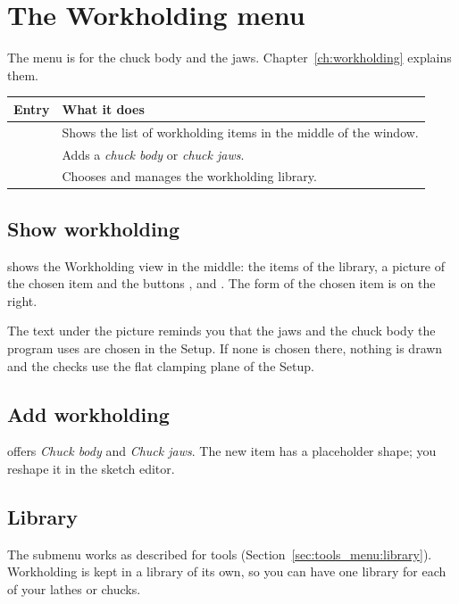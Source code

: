 \chapter{The Workholding menu}\label{ch:workholding_menu}

The  menu is for the chuck body and the jaws. Chapter~\ref{ch:workholding} explains them.

\begin{center}
\begin{tabularx}{\textwidth}{@{}l Y@{}}
\toprule
\textbf{Entry} & \textbf{What it does} \\
\midrule
{} & Shows the list of workholding items in the middle of the window. \\
 & Adds a \emph{chuck body} or \emph{chuck jaws}. \\
 & Chooses and manages the workholding library. \\
\bottomrule
\end{tabularx}
\end{center}

\section{Show workholding}
 shows the Workholding view in the middle: the items of the library, a picture of the chosen item and the buttons ,  and . The form of the chosen item is on the right.

The text under the picture reminds you that the jaws and the chuck body the program uses are chosen in the Setup. If none is chosen there, nothing is drawn and the checks use the flat clamping plane of the Setup.

\section{Add workholding}
 offers \emph{Chuck body} and \emph{Chuck jaws}. The new item has a placeholder shape; you reshape it in the sketch editor.

\section{Library}
The  submenu works as described for tools (Section~\ref{sec:tools_menu:library}). Workholding is kept in a library of its own, so you can have one library for each of your lathes or chucks.
